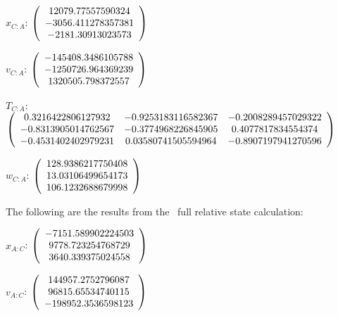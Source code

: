 \begin{description}
$x_{C:A}$: $\left( \begin{array} {ccc} 12079.77557590324 \\    -3056.411278357381 \\     -2181.30913023573
\end{array} \right)\\ \\$

$v_{C:A}$:  $\left( \begin{array} {ccc}  -145408.3486105788 \\    -1250726.964369239 \\     1320505.798372557
\end{array} \right)\\ \\$

$T_{C:A}$: $\left( \begin{array} {ccc}
0.3216422806127932 &   -0.9253183116582367 &   -0.2008289457029322 \\
 -0.8313905014762567 &   -0.3774968226845905 &    0.4077817834554374 \\
  -0.4531402402979231 &   0.03580741505594964 &   -0.8907197941270596 \\
\end{array} \right)\\ \\$

$w_{C:A}$:  $\left( \begin{array} {ccc}
 128.9386217750408 \\     13.03106499654173 \\     106.1232688679998
\end{array} \right)\\ \\$

The following are the results from the \ full relative state calculation:

$x_{A:C}$: $\left( \begin{array} {ccc}  -7151.589902224503 \\     9778.723254768729 \\     3640.339375024558
\end{array} \right)\\ \\$

$v_{A:C}$:  $\left( \begin{array} {ccc}  144957.2752796087 \\     96815.65534740115 \\    -198952.3536598123
\end{array} \right)\\ \\$


\end{description}
